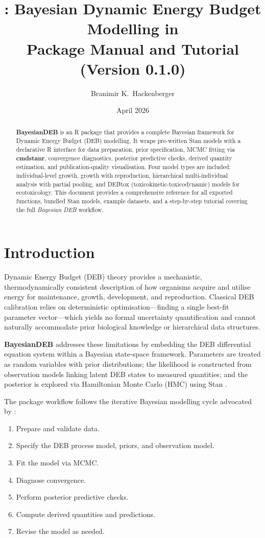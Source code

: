 \documentclass[11pt,a4paper]{article}
\title{\pkg{BayesianDEB}: Bayesian Dynamic Energy Budget Modelling in \R\\[1ex]
       \large Package Manual and Tutorial (Version 0.1.0)}
\author{Branimir K.\ Hackenberger}
\date{April 2026}
\newcommand{\pkg}[1]{\textbf{#1}}
\newcommand{\R}{\textsf{R}}
\newcommand{\Stan}{\textsf{Stan}}
\newcommand{\BDEB}{\textit{Bayesian DEB}}
\begin{document}
\maketitle

\begin{abstract}
\pkg{BayesianDEB} is an \R{} package that provides a complete Bayesian
framework for Dynamic Energy Budget (DEB) modelling.  It wraps pre-written
\Stan{} models with a declarative \R{} interface for data preparation,
prior specification, MCMC fitting via \pkg{cmdstanr}, convergence
diagnostics, posterior predictive checks, derived quantity estimation, and
publication-quality visualisation.  Four model types are included:
individual-level growth, growth with reproduction, hierarchical
multi-individual analysis with partial pooling, and DEBtox
(toxicokinetic-toxicodynamic) models for ecotoxicology.  This document
provides a comprehensive reference for all exported functions, bundled Stan
models, example datasets, and a step-by-step tutorial covering the full
\BDEB{} workflow.
\end{abstract}

\tableofcontents
\newpage

\section{Introduction}
\label{sec:introduction}

Dynamic Energy Budget (DEB) theory \citep{Kooijman2010} provides a
mechanistic, thermodynamically consistent description of how organisms
acquire and utilise energy for maintenance, growth, development, and
reproduction.  Classical DEB calibration relies on deterministic
optimisation---finding a single best-fit parameter vector---which yields no
formal uncertainty quantification and cannot naturally accommodate prior
biological knowledge or hierarchical data structures.

\pkg{BayesianDEB} addresses these limitations by embedding the DEB
differential equation system within a Bayesian state-space framework.
Parameters are treated as random variables with prior distributions; the
likelihood is constructed from observation models linking latent DEB states
to measured quantities; and the posterior is explored via Hamiltonian Monte
Carlo (HMC) using \Stan{} \citep{Carpenter2017}.

The package workflow follows the iterative Bayesian modelling cycle
advocated by \citet{Gelman2020}:
\begin{enumerate}[nosep]
  \item Prepare and validate data.
  \item Specify the DEB process model, priors, and observation model.
  \item Fit the model via MCMC.
  \item Diagnose convergence.
  \item Perform posterior predictive checks.
  \item Compute derived quantities and predictions.
  \item Revise the model as needed.
\end{enumerate}
\end{document}
